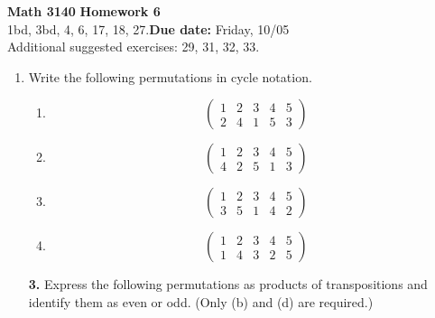 \documentclass[12pt,reqno]{amsart}
\newcommand{\probskip}{\vskip1cm}
\begin{document}
\thispagestyle{empty}

\noindent \textbf{Math 3140} \hfill {\bf Homework 6}\\[4pt]
   1bd, 3bd, 4, 6, 17, 18, 27.\hfill {\bf Due date:} Friday, 10/05\\  
   Additional suggested exercises: 29, 31, 32, 33.  \\


\medskip


\begin{enumerate}[{\bf 1.}]

\item %
Write the following permutations in cycle notation.
\begin{multicols}{2}
\begin{enumerate}
 
\item
\[
\begin{pmatrix}
1 & 2 & 3 & 4 & 5 \\
2 & 4 & 1 & 5 & 3
\end{pmatrix}
\]

\item
\[
\begin{pmatrix}
1 & 2 & 3 & 4 & 5 \\
4 & 2 & 5 & 1 & 3
\end{pmatrix}
\]

\item
\[
\begin{pmatrix}
1 & 2 & 3 & 4 & 5 \\
3 & 5 & 1 & 4 & 2
\end{pmatrix}
\]

\item
\[
\begin{pmatrix}
1 & 2 & 3 & 4 & 5 \\
1 & 4 & 3 & 2 & 5
\end{pmatrix}
\]

\end{enumerate}
\end{multicols}

\probskip
 
\item[{\bf 3.}] 
Express the following permutations as products of transpositions and
identify them as even or odd.  (Only (b) and (d) are required.)
\begin{multicols}{2}
\begin{enumerate}
 

\end{enumerate}
\end{multicols}
\end{enumerate}
\end{document}
